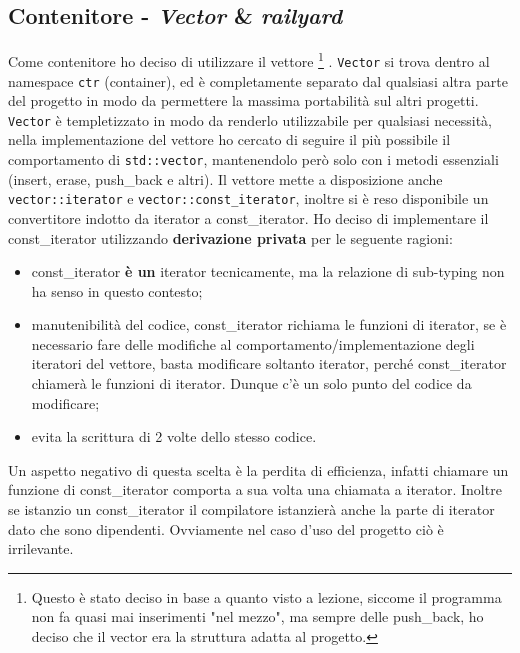 \documentclass[a4paper,10pt]{article}
\begin{document}
\subsection {Contenitore - \emph{Vector} \& \emph{railyard}}
\label{sec:container}
Come contenitore ho deciso di utilizzare il vettore%
\footnote {Questo è stato deciso in base a quanto visto a lezione, siccome il programma non fa quasi mai inserimenti "nel mezzo", ma sempre delle push\_back, ho deciso che il vector era la struttura adatta al progetto.}%
. \texttt{Vector} si trova dentro al namespace \texttt{ctr} (container), ed è completamente separato dal qualsiasi altra parte del progetto in modo da permettere la massima portabilità sul altri progetti. 
\texttt{Vector} è templetizzato in modo da renderlo utilizzabile per qualsiasi necessità, nella implementazione del vettore ho cercato di seguire il più possibile il comportamento di \texttt{std::vector}, mantenendolo però solo con i metodi essenziali (insert, erase, push\_back e altri). Il vettore mette a disposizione anche \texttt{vector::iterator} e \texttt{vector::const\_iterator}, inoltre si è reso disponibile un convertitore indotto da iterator a const\_iterator. Ho deciso di implementare il const\_iterator utilizzando \textbf{derivazione privata} per le seguente ragioni:
\begin{itemize} 
  \item const\_iterator \textbf{è un} iterator tecnicamente, ma la relazione di sub-typing non ha senso in questo contesto;
  \item manutenibilità del codice, const\_iterator richiama le funzioni di iterator, se è necessario fare delle modifiche al comportamento/implementazione degli iteratori del vettore, basta modificare soltanto iterator, perché const\_iterator chiamerà le funzioni di iterator. Dunque c'è un solo punto del codice da modificare;
  \item evita la scrittura di 2 volte dello stesso codice. 
\end{itemize}
Un aspetto negativo di questa scelta è la perdita di efficienza, infatti chiamare un funzione di const\_iterator comporta a sua volta una chiamata a iterator. Inoltre se istanzio un const\_iterator 
il compilatore istanzierà anche la parte di iterator dato che sono dipendenti. Ovviamente nel caso d'uso del progetto ciò è irrilevante. 
\end{document}
